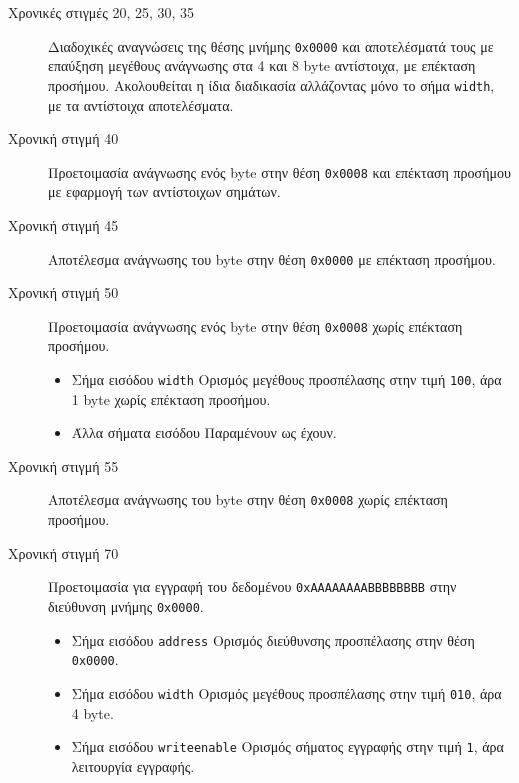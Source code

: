 \documentclass[11pt]{extarticle}
\begin{document}
\begin{description}
\begin{itemize}
\end{itemize}
\item[Χρονικές στιγμές 20, 25, 30, 35] \hfill \newline
Διαδοχικές αναγνώσεις της θέσης μνήμης \texttt{0x0000} και αποτελέσματά τους με επαύξηση μεγέθους ανάγνωσης στα 4 και 8 byte αντίστοιχα, με επέκταση προσήμου. \newline
Ακολουθείται η ίδια διαδικασία αλλάζοντας μόνο το σήμα \texttt{width}, με τα αντίστοιχα αποτελέσματα.
\item [Χρονική στιγμή 40] \hfill \newline
Προετοιμασία ανάγνωσης ενός byte στην θέση \texttt{0x0008} και επέκταση προσήμου με εφαρμογή των αντίστοιχων σημάτων.
\item [Χρονική στιγμή 45] \hfill \newline
Αποτέλεσμα ανάγνωσης του byte στην θέση \texttt{0x0000} με επέκταση προσήμου.
\item [Χρονική στιγμή 50] \hfill \newline
Προετοιμασία ανάγνωσης ενός byte στην θέση \texttt{0x0008} χωρίς επέκταση προσήμου.
\begin{itemize}
    \item Σήμα εισόδου \texttt{width} \newline Ορισμός μεγέθους προσπέλασης στην τιμή \texttt{100}, άρα 1 byte χωρίς επέκταση προσήμου.
    \item Άλλα σήματα εισόδου \newline Παραμένουν ως έχουν.
\end{itemize}
\item [Χρονική στιγμή 55] \hfill \newline
Αποτέλεσμα ανάγνωσης του byte στην θέση \texttt{0x0008} χωρίς επέκταση προσήμου.
\item [Χρονική στιγμή 70] \hfill \newline
Προετοιμασία για εγγραφή του δεδομένου \texttt{0xAAAAAAAABBBBBBBB} στην διεύθυνση μνήμης \texttt{0x0000}.
\begin{itemize}
    \item Σήμα εισόδου \texttt{address} \newline Ορισμός διεύθυνσης προσπέλασης στην θέση \texttt{0x0000}.
    \item Σήμα εισόδου \texttt{width} \newline Ορισμός μεγέθους προσπέλασης στην τιμή \texttt{010}, άρα 4 byte.
    \item Σήμα εισόδου \texttt{write\textunderscore enable} \newline Ορισμός σήματος εγγραφής στην τιμή \texttt{1}, άρα λειτουργία εγγραφής.

\end{itemize}
\end{description}
\end{document}
